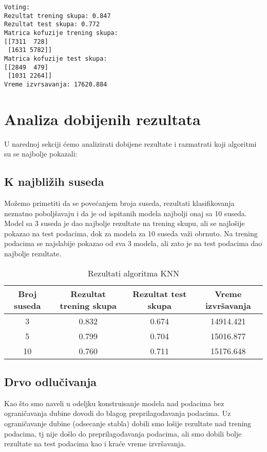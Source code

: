 \documentclass[a4paper]{article}
\begin{document}
\begin{tcolorbox}
\begin{verbatim}
Voting:
Rezultat trening skupa: 0.847
Rezultat test skupa: 0.772
Matrica kofuzije trening skupa:
[[7311  728]
 [1631 5782]]
Matrica kofuzije test skupa:
[[2849  479]
 [1031 2264]]
Vreme izvrsavanja: 17620.884
\end{verbatim}
\end{tcolorbox}

\section{Analiza dobijenih rezultata}
U narednoj sekciji ćemo analizirati dobijene rezultate i razmatrati koji algoritmi su se najbolje pokazali:

\subsection{K najbližih suseda}
Možemo primetiti da se povećanjem broja suseda, rezultati klasifikovanja neznatno poboljšavaju i da je od ispitanih modela najbolji onaj sa 10 suseda. Model  sa 3 suseda je dao najbolje rezultate na trening skupu, ali se najlošije pokazao na test podacima,  dok za modela za 10 suseda važi obrnuto. Na trening podacima se najslabije pokazao od sva 3 modela, ali zato je na test podacima dao najbolje rezultate.

\begin{table}[h]
\centering
\begin{tabular}{|c|c|c|c|}
\hline
Broj suseda & Rezultat trening skupa & Rezultat test skupa & Vreme izvršavanja \\ \hline
3           & 0.832                  & 0.674               & 14914.421         \\ \hline
5           & 0.799                  & 0.704               & 15016.877         \\ \hline
10          & 0.760                  & 0.711               & 15176.648         \\ \hline
\end{tabular}
\caption{Rezultati algoritma KNN}
\end{table}


\pagebreak

\subsection{Drvo odlučivanja}
Kao što smo naveli u odeljku  konstruisanje modela nad podacima bez ograničavanja dubine dovodi do blagog preprilagođavanja podacima.
Uz ograničavanje dubine (odsecanje stabla) dobili smo lošije rezultate nad trening podacima, tj nije došlo do preprilagođavanja podacima, ali smo dobili bolje rezultate na test podacima kao i kraće vreme izvršavanja.
\end{document}
